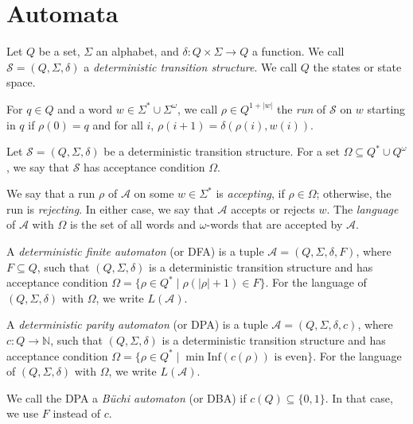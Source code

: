 \section{Automata}
\begin{defn}
	Let $Q$ be a set, $\Sigma$ an alphabet, and $\delta : Q \times \Sigma \rightarrow Q$ a function. We call $\mathcal{S} = (Q, \Sigma, \delta)$ a \emph{deterministic transition structure}. We call $Q$ the states or state space.
	
	For $q \in Q$ and a word $w \in \Sigma^* \cup \Sigma^\omega$, we call $\rho \in Q^{1+|w|}$ the \emph{run} of $\mathcal{S}$ on $w$ starting in $q$ if $\rho(0) = q$ and for all $i$, $\rho(i+1) = \delta(\rho(i), w(i))$.
\end{defn}

\begin{defn}
	Let $\mathcal{S} = (Q, \Sigma, \delta)$ be a deterministic transition structure. For a set $\Omega \subseteq Q^* \cup Q^\omega$, we say that $\mathcal{S}$ has acceptance condition $\Omega$.
	
	We say that a run $\rho$ of $\mathcal{A}$ on some $w \in \Sigma^*$ is \emph{accepting}, if $\rho \in \Omega$; otherwise, the run is \emph{rejecting}. In either case, we say that $\mathcal{A}$ accepts or rejects $w$. The \emph{language} of $\mathcal{A}$ with $\Omega$ is the set of all words and $\omega$-words that are accepted by $\mathcal{A}$. 
\end{defn}

\begin{defn}
	A \emph{deterministic finite automaton} (or DFA) is a tuple $\mathcal{A} = (Q, \Sigma, \delta, F)$, where $F \subseteq Q$, such that $(Q, \Sigma, \delta)$ is a deterministic transition structure and has acceptance condition $\Omega = \{ \rho \in Q^* \mid \rho(|\rho|+1) \in F \}$. For the language of $(Q, \Sigma, \delta)$ with $\Omega$, we write $L(\mathcal{A})$.
\end{defn}

\begin{defn}
	A \emph{deterministic parity automaton} (or DPA) is a tuple $\mathcal{A} = (Q, \Sigma, \delta, c)$, where $c : Q \rightarrow \mathbb{N}$, such that $(Q, \Sigma, \delta)$ is a deterministic transition structure and has acceptance condition $\Omega = \{ \rho \in Q^* \mid \min \text{Inf}(c(\rho)) \text{ is even} \}$. For the language of $(Q, \Sigma, \delta)$ with $\Omega$, we write $L(\mathcal{A})$.
	
	We call the DPA a \emph{B\"uchi automaton} (or DBA) if $c(Q) \subseteq \{0, 1\}$. In that case, we use $F$ instead of $c$.
\end{defn}

